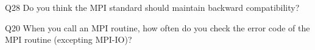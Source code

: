 \begin{description}%
\item{Q28} Do you think the MPI standard should maintain backward compatibility?%
\item{Q20} When you call an MPI routine, how often do you check the error code of the MPI routine  (excepting MPI-IO)?%
\end{description}%
